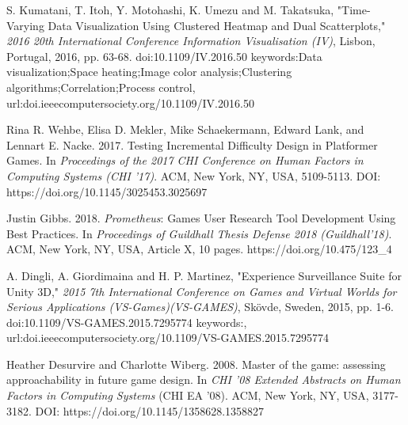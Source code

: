 \documentclass[journal]{IEEEtran}
\begin{document}

%
%
%
\begin{thebibliography}{1}


S. Kumatani, T. Itoh, Y. Motohashi, K. Umezu and M. Takatsuka, "Time-Varying Data Visualization Using Clustered Heatmap and Dual Scatterplots," \emph{2016 20th International Conference Information Visualisation (IV)}, Lisbon, Portugal, 2016, pp. 63-68. doi:10.1109/IV.2016.50 keywords:{Data visualization;Space heating;Image color analysis;Clustering algorithms;Correlation;Process control},
url:doi.ieeecomputersociety.org/10.1109/IV.2016.50

Rina R. Wehbe, Elisa D. Mekler, Mike Schaekermann, Edward Lank, and Lennart E. Nacke. 2017. Testing Incremental Difficulty Design in Platformer Games. In \emph{Proceedings of the 2017 CHI Conference on Human Factors in Computing Systems (CHI '17)}. ACM, New York, NY, USA, 5109-5113. DOI: https://doi.org/10.1145/3025453.3025697

Justin Gibbs. 2018. \emph{Prometheus}: Games User Research Tool Development Using Best Practices. In \emph{Proceedings of Guildhall Thesis Defense 2018 (Guildhall’18)}. ACM, New York, NY, USA, Article X, 10 pages. https://doi.org/10.475/123\_4

A. Dingli, A. Giordimaina and H. P. Martinez, "Experience Surveillance Suite for Unity 3D," \emph{2015 7th International Conference on Games and Virtual Worlds for Serious Applications (VS-Games)(VS-GAMES)}, Skövde, Sweden, 2015, pp. 1-6.
doi:10.1109/VS-GAMES.2015.7295774 keywords:{}, url:doi.ieeecomputersociety.org/10.1109/VS-GAMES.2015.7295774

Heather Desurvire and Charlotte Wiberg. 2008. Master of the game: assessing approachability in future game design. In \emph{CHI '08 Extended Abstracts on Human Factors in Computing Systems} (CHI EA '08). ACM, New York, NY, USA, 3177-3182. DOI: https://doi.org/10.1145/1358628.1358827


\end{thebibliography}
\end{document}
